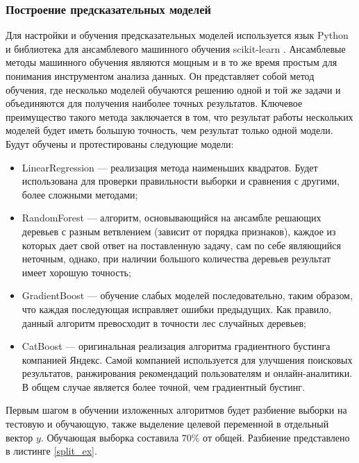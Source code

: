 \subsubsection{Построение предсказательных моделей}
Для настройки и обучения предсказательных моделей используется язык Python и библиотека для ансамблевого машинного обучения scikit-learn \cite{hackeling2017mastering}. Ансамблевые методы машинного обучения являются мощным и в то же время простым для понимания инструментом анализа данных. Он представляет собой метод обучения, где несколько моделей обучаются решению одной и той же задачи и объединяются для получения наиболее точных результатов. Ключевое преимущество такого метода заключается в том, что результат работы нескольких моделей будет иметь большую точность, чем результат только одной модели.
Будут обучены и протестированы следующие модели:
\begin{itemize}
	\item LinearRegression --- реализация метода наименьших квадратов. Будет использована для проверки правильности выборки и сравнения с другими, более сложными методами;
	\item RandomForest \cite{rigatti2017random} --- алгоритм, основывающийся на ансамбле решающих деревьев с разным ветвлением (зависит от порядка признаков), каждое из которых дает свой ответ на поставленную задачу, сам по себе являющийся неточным, однако, при наличии большого количества деревьев результат имеет хорошую точность;
	\item GradientBoost \cite{natekin2013gradient} --- обучение слабых моделей последовательно, таким образом, что каждая последующая исправляет ошибки предыдущих. Как правило, данный алгоритм превосходит в точности лес случайных деревьев;
	\item CatBoost \cite{hancock2020catboost} --- оригинальная реализация алгоритма градиентного бустинга компанией Яндекс. Самой компанией используется для улучшения поисковых результатов,  ранжирования рекомендаций пользователям и онлайн-аналитики. В общем случае является более точной, чем градиентный бустинг.
\end{itemize}

Первым шагом в обучении изложенных алгоритмов будет разбиение выборки на тестовую и обучающую, также выделение целевой переменной в отдельный вектор $y$. Обучающая выборка составила $70\%$ от общей. Разбиение представлено в листинге \ref{split_ex}.

